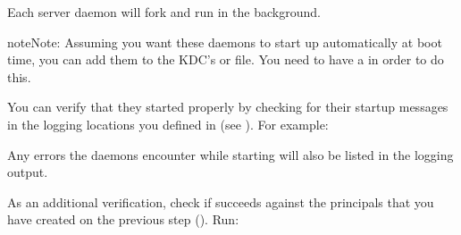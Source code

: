 \documentclass[letterpaper,10pt,english]{sphinxmanual}
\begin{document}
\begin{sphinxVerbatim}[commandchars=\\\{\}]
 
 
\end{sphinxVerbatim}

\sphinxAtStartPar
Each server daemon will fork and run in the background.

\begin{sphinxadmonition}{note}{Note:}
\sphinxAtStartPar
Assuming you want these daemons to start up automatically at
boot time, you can add them to the KDC’s  or
 file.  You need to have a
 in order to do this.
\end{sphinxadmonition}

\sphinxAtStartPar
You can verify that they started properly by checking for their
startup messages in the logging locations you defined in
{\hyperref[\detokenize{admin/conf_files/krb5_conf:krb5-conf-5}]{}} (see {\hyperref[\detokenize{admin/conf_files/kdc_conf:logging}]{}}).  For example:

\begin{sphinxVerbatim}[commandchars=\\\{\}]
  
    \PYG{p}{[}\PYG{p}{]}  
  
    \PYG{p}{[}\PYG{p}{]} 
\end{sphinxVerbatim}

\sphinxAtStartPar
Any errors the daemons encounter while starting will also be listed in
the logging output.

\sphinxAtStartPar
As an additional verification, check if  succeeds
against the principals that you have created on the previous step
({\hyperref[\detokenize{admin/install_kdc:addadmin-kdb}]{}}).  Run:
\end{document}

